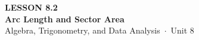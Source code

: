 \documentclass[aspectratio=169, 11pt]{beamer}
\begin{document}
{
\begin{frame}[plain]
  \vspace{2.8cm}\hspace{0.55cm}%
  \begin{minipage}{0.9\textwidth}
    {\color{goldacc}\bfseries\small LESSON 8.2}\\[0.5cm]
    {\color{white}\bfseries\LARGE Arc Length and Sector Area}\\[1.2cm]
    {\color{mistmid}\small Algebra, Trigonometry, and Data Analysis~$\cdot$~Unit 8}
  \end{minipage}
\end{frame}
}

\begin{frame}[t, plain]
\end{frame}
\end{document}
